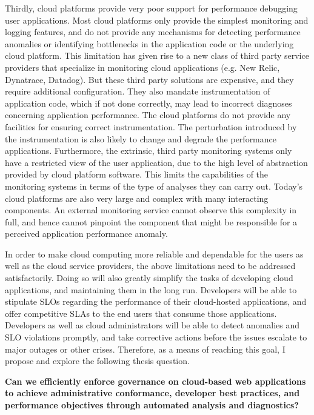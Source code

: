 Thirdly, cloud platforms provide very poor support for performance debugging
user applications. Most cloud platforms only provide the simplest monitoring and logging features,
and do not provide any mechanisms for detecting performance anomalies or identifying
bottlenecks in the application code or the underlying cloud platform. This limitation has given rise
to a new class of third party service providers that specialize in monitoring cloud applications
(e.g. New Relic, Dynatrace, Datadog). But these third party solutions are expensive, and they 
require additional configuration. 
They also mandate instrumentation of application code, which if not done
correctly, may lead to incorrect diagnoses concerning application performance. The cloud
platforms do not provide any facilities for ensuring correct instrumentation. The perturbation
introduced by the instrumentation is also likely to change and degrade the performance
applications.
Furthermore, the extrinsic, third party monitoring systems only have a restricted view 
of the user application, due to the high level of abstraction provided by cloud platform software.
This limits the capabilities of the monitoring systems in terms of the type of analyses they can carry out.
Today's cloud platforms are also very large and complex with many interacting components.
An external monitoring service cannot observe this complexity in full, and hence cannot pinpoint
the component that might be responsible for a perceived application performance anomaly.

In order to make cloud computing more reliable and dependable for the users as well
as the cloud service providers, the above limitations need to be addressed satisfactorily.
Doing so will also greatly simplify the tasks of developing cloud applications, and maintaining 
them in the long run. Developers will be able to stipulate SLOs regarding the performance of
their cloud-hosted applications, and offer competitive SLAs to the end users that consume those
applications. Developers as well as cloud administrators will be able to detect anomalies and
SLO violations promptly, and take corrective actions before the issues escalate to major
outages or other crises. Therefore, as a means of reaching this goal, I propose and explore the
following thesis question.

{\bf Can we efficiently enforce governance on cloud-based web applications to achieve 
administrative conformance, developer best practices, and performance objectives through 
automated analysis and diagnostics?} 

